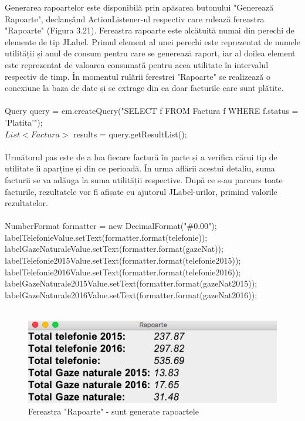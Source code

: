 \documentclass[12pt]{book}
\begin{document}
Generarea rapoartelor este disponibilă prin apăsarea butonului "Generează Rapoarte", declanșând ActionListener-ul respectiv care rulează fereastra "Rapoarte" (Figura 3.21). Fereastra rapoarte este alcătuită numai din perechi de elemente de tip JLabel. Primul element al unei perechi este reprezentat de numele utilității și anul de consum pentru care se generează raport, iar al doilea element este reprezentat de valoarea consumată pentru acea utilitate în intervalul respectiv de timp. În momentul rulării ferestrei "Rapoarte" se realizează o conexiune la baza de date și se extrage din ea doar facturile care sunt plătite.\\\\
Query query = em.createQuery("SELECT f FROM Factura f WHERE f.status = 'Platita'");\\
$List<$$Factura>$ results = query.getResultList();\\\\
Următorul pas este de a lua fiecare factură în parte și a verifica cărui tip de utilitate îi aparține și din ce perioadă. În urma aflării acestui detaliu, suma facturii se va adăuga la suma utilității respective. După ce s-au parcurs toate facturile, rezultatele vor fi afișate cu ajutorul JLabel-urilor, primind valorile rezultatelor.\\\\
NumberFormat formatter = new DecimalFormat("\#0.00");\\     
labelTelefonieValue.setText(formatter.format(telefonie));\\
labelGazeNaturaleValue.setText(formatter.format(gazeNat));\\
labelTelefonie2015Value.setText(formatter.format(telefonie2015));\\
labelTelefonie2016Value.setText(formatter.format(telefonie2016));\\
labelGazeNaturale2015Value.setText(formatter.format(gazeNat2015));\\
labelGazeNaturale2016Value.setText(formatter.format(gazeNat2016));\\\\

\begin{figure}[!ht]
	\centering
	\includegraphics{FereastraRapoarte}
	\caption{Fereastra "Rapoarte" - sunt generate rapoartele}
\end{figure}
\end{document}
